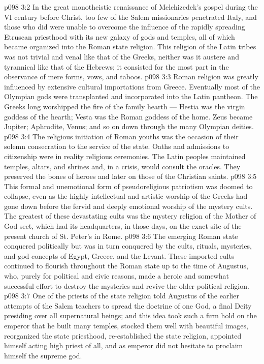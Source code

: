 \vs p098 3:2 In the great monotheistic renaissance of Melchizedek’s gospel during the VI century before Christ, too few of the Salem missionaries penetrated Italy, and those who did were unable to overcome the influence of the rapidly spreading Etruscan priesthood with its new galaxy of gods and temples, all of which became organized into the Roman state religion. This religion of the Latin tribes was not trivial and venal like that of the Greeks, neither was it austere and tyrannical like that of the Hebrews; it consisted for the most part in the observance of mere forms, vows, and taboos.
\vs p098 3:3 Roman religion was greatly influenced by extensive cultural importations from Greece. Eventually most of the Olympian gods were transplanted and incorporated into the Latin pantheon. The Greeks long worshipped the fire of the family hearth --- Hestia was the virgin goddess of the hearth; Vesta was the Roman goddess of the home. Zeus became Jupiter; Aphrodite, Venus; and so on down through the many Olympian deities.
\vs p098 3:4 The religious initiation of Roman youths was the occasion of their solemn consecration to the service of the state. Oaths and admissions to citizenship were in reality religious ceremonies. The Latin peoples maintained temples, altars, and shrines and, in a crisis, would consult the oracles. They preserved the bones of heroes and later on those of the Christian saints.
\vs p098 3:5 This formal and unemotional form of pseudoreligious patriotism was doomed to collapse, even as the highly intellectual and artistic worship of the Greeks had gone down before the fervid and deeply emotional worship of the mystery cults. The greatest of these devastating cults was the mystery religion of the Mother of God sect, which had its headquarters, in those days, on the exact site of the present church of St. Peter’s in Rome.
\vs p098 3:6 \pc The emerging Roman state conquered politically but was in turn conquered by the cults, rituals, mysteries, and god concepts of Egypt, Greece, and the Levant. These imported cults continued to flourish throughout the Roman state up to the time of Augustus, who, purely for political and civic reasons, made a heroic and somewhat successful effort to destroy the mysteries and revive the older political religion.
\vs p098 3:7 One of the priests of the state religion told Augustus of the earlier attempts of the Salem teachers to spread the doctrine of one God, a final Deity presiding over all supernatural beings; and this idea took such a firm hold on the emperor that he built many temples, stocked them well with beautiful images, reorganized the state priesthood, re\hyp{}established the state religion, appointed himself acting high priest of all, and as emperor did not hesitate to proclaim himself the supreme god.

